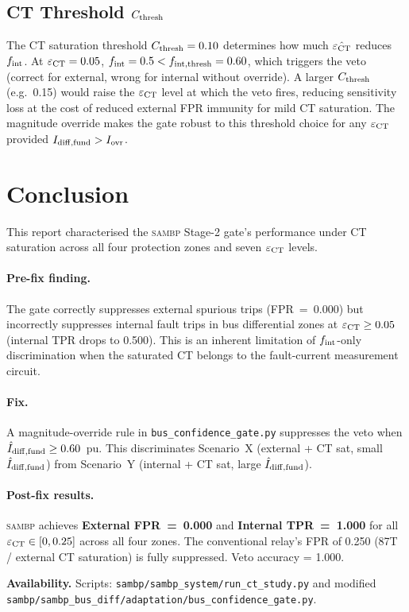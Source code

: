 \documentclass[12pt,a4paper]{article}
\newcommand{\SAMBP}{\textsc{sambp}}
\newcommand{\fint}{f_{\rm int}}
\newcommand{\epsct}{\varepsilon_{\rm CT}}
\begin{document}
\subsection{CT Threshold $C_{\rm thresh}$}

The CT saturation threshold $C_{\rm thresh} = 0.10$ determines how much
$\hat{\epsct}$ reduces $\fint$.  At $\epsct = 0.05$, $\fint = 0.5 <
f_{\rm int,thresh} = 0.60$, which triggers the veto (correct for external,
wrong for internal without override).  A larger $C_{\rm thresh}$ (e.g.\
0.15) would raise the $\epsct$ level at which the veto fires, reducing
sensitivity loss at the cost of reduced external FPR immunity for mild
CT saturation.  The magnitude override makes the gate robust to this
threshold choice for any $\epsct$ provided $I_{\rm diff,fund} > I_{\rm ovr}$.

\section{Conclusion}

This report characterised the \SAMBP{} Stage-2 gate's performance under
CT saturation across all four protection zones and seven $\epsct$ levels.

\paragraph{Pre-fix finding.}
The gate correctly suppresses external spurious trips (FPR~=~0.000) but
incorrectly suppresses internal fault trips in bus differential zones
at $\epsct \geq 0.05$ (internal TPR drops to 0.500).  This is an
inherent limitation of $\fint$-only discrimination when the saturated CT
belongs to the fault-current measurement circuit.

\paragraph{Fix.}
A magnitude-override rule in \texttt{bus\_confidence\_gate.py} suppresses
the veto when $\hat{I}_{\rm diff,fund} \geq 0.60$~pu.  This discriminates
Scenario~X (external + CT sat, small $\hat{I}_{\rm diff,fund}$) from
Scenario~Y (internal + CT sat, large $\hat{I}_{\rm diff,fund}$).

\paragraph{Post-fix results.}
\SAMBP{} achieves \textbf{External FPR~=~0.000} and \textbf{Internal
TPR~=~1.000} for all $\epsct \in [0, 0.25]$ across all four zones.
The conventional relay's FPR of 0.250 (87T / external CT saturation)
is fully suppressed.  Veto accuracy = 1.000.

\bigskip\noindent\textbf{Availability.}
Scripts: \texttt{sambp/sambp\_system/run\_ct\_study.py} and modified
\texttt{sambp/sambp\_bus\_diff/adaptation/bus\_confidence\_gate.py}.

\newpage


\end{document}
